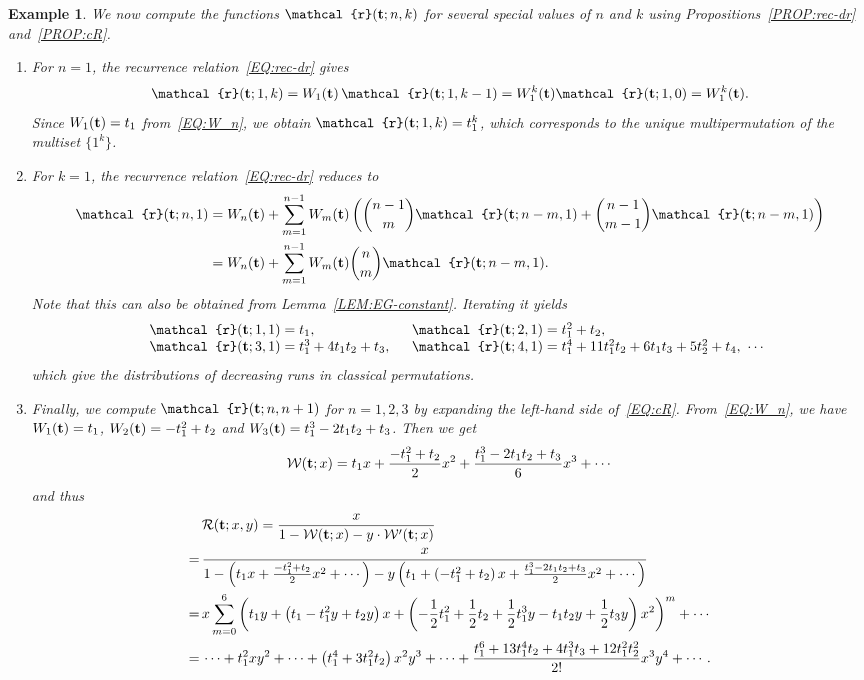 \documentclass[11pt]{article}
\newcommand{\vt} { {\bf t}}
\numberwithin{equation}{section}
\newtheorem{exa}[thm]{Example}
\def\cR{\mathcal{R}}
\def\cW{\mathcal{W}}
\newcommand{\ccr}{\mathcal{r}}
\begin{document}
\begin{exa}
	We now compute the functions $\ccr(\vt;n,k)$ for several special values of $n$ and $k$ using Propositions~\ref{PROP:rec-dr} and~\ref{PROP:cR}.
	\begin{enumerate}
		\item For $n=1$, the recurrence relation~\eqref{EQ:rec-dr} gives
		\[
		\ccr(\vt;1,k)=W_1(\vt)\,\ccr(\vt;1,k-1)=W_1^k(\vt)\ccr(\vt;1,0)=W_1^k(\vt).
		\]
		Since $W_1(\vt)=t_1$ from~\eqref{EQ:W_n}, we obtain $\ccr(\vt;1,k)=t_1^k$, which corresponds to the unique multipermutation of the multiset $\{1^k\}$.
		
		\item For $k=1$, the recurrence relation~\eqref{EQ:rec-dr} reduces to
		\begin{align*}
		\ccr(\vt;n,1)
		&=W_n(\vt)+\sum_{m=1}^{n-1}W_m(\vt)\left(\binom{n-1}{m}\ccr(\vt;n-m,1)+\binom{n-1}{m-1}\ccr(\vt;n-m,1)\right)\\
		&=W_n(\vt)+\sum_{m=1}^{n-1}W_m(\vt)\binom{n}{m}\ccr(\vt;n-m,1).
		\end{align*}
		Note that this can also be obtained from Lemma~\ref{LEM:EG-constant}. Iterating it yields
		\begin{align*}
		\begin{array}{llll}
		&\ccr(\vt;1,1)=t_1,\qquad\qquad\qquad
		&\ccr(\vt;2,1)=t_1^2 + t_2,\\
		&\ccr(\vt;3,1)=t_1^3 + 4 t_1 t_2 + t_3,
		&\ccr(\vt;4,1)=t_1^4 + 11 t_1^2 t_2 + 6 t_1 t_3 + 5 t_2^2 + t_4,\ \cdots\\
		\end{array}
		\end{align*}
		which give the distributions of decreasing runs in classical permutations. 
		
		\item Finally, we compute $\ccr(\vt;n,n+1)$ for $n=1,2,3$ by expanding the left-hand side of~\eqref{EQ:cR}. From~\eqref{EQ:W_n}, we have $W_1(\vt)=t_1$, $W_2(\vt)=-t_1^2+t_2$ and $W_3(\vt)=t_1^3 - 2t_1t_2 + t_3$. Then we get
		\[\cW(\vt;x)=t_1x+\frac{-t_1^2+t_2}{2}x^2+\frac{t_1^3 - 2t_1t_2 + t_3}{6}x^3+\cdots\]
		and thus
		\begin{align*}%
		&\cR(\vt;x,y)=\frac{x}{1-\cW(\vt;x)-y\cdot \cW'(\vt;x)}\\
		=\,&\frac{x}{1-\left(t_1x+\frac{-t_1^2+t_2}{2}x^2+\cdots\right)-y \left(t_1+\left(-t_1^2+t_2\right)x+\frac{t_1^3 - 2t_1t_2 + t_3}{2}x^2+\cdots\right)}\\
		=\,&x\sum_{m=0}^{6}\left(t_1y+\left(t_1-t_1^2y+t_2y\right)x+\left(-\frac{1}{2}t_1^2+\frac{1}{2}t_2+\frac{1}{2}t_1^3y-t_1t_2y+\frac{1}{2}t_3y\right)x^2\right)^m+\cdots\\
		=\,&\cdots+t_1^2xy^2+\cdots+\left(t_1^4 + 3t_1^2t_2\right)x^2y^3+\cdots+\frac{t_1^6 + 13t_1^4t_2 + 4t_1^3t_3 + 12t_1^2t_2^2}{2!}x^3y^4+\cdots.
		\end{align*}
		

\end{enumerate}
\end{exa}
\end{document}
